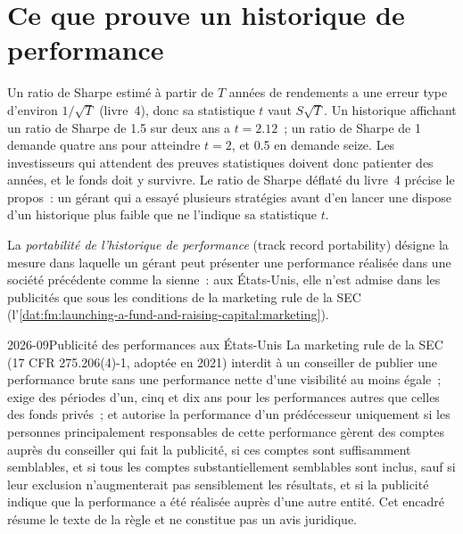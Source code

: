 \section{Ce que prouve un historique de performance}

Un ratio de Sharpe estimé à partir de $T$ années de rendements a une erreur type d'environ $1/\sqrt T$ (livre~4), donc sa statistique $t$ vaut $S\sqrt T$. Un historique
affichant un ratio de Sharpe de 1.5 sur deux ans a $t=2.12$~; un ratio de Sharpe de 1 demande quatre ans pour atteindre $t=2$, et 0.5 en demande seize. Les investisseurs qui
attendent des preuves statistiques doivent donc patienter des années, et le fonds doit y survivre. Le ratio de Sharpe déflaté du livre~4 précise le propos~: un gérant qui
a essayé plusieurs stratégies avant d'en lancer une dispose d'un historique plus faible que ne l'indique sa statistique $t$.

\begin{definition}\label{def:fm:launching-a-fund-and-raising-capital:port}
La \emph{portabilité de l'historique de performance} (track record portability) désigne la mesure dans laquelle un gérant peut présenter une performance réalisée dans une société précédente
comme la sienne~: aux États-Unis, elle n'est admise dans les publicités que sous les conditions de la marketing rule de la SEC
(l'\cref{dat:fm:launching-a-fund-and-raising-capital:marketing}).
\end{definition}

\begin{dated}{2026-09}{Publicité des performances aux États-Unis}\label{dat:fm:launching-a-fund-and-raising-capital:marketing}
La marketing rule de la SEC (17 CFR 275.206(4)-1, adoptée en 2021) interdit à un conseiller de publier une performance brute sans une performance nette d'une visibilité au
moins égale~; exige des périodes d'un, cinq et dix ans pour les performances autres que celles des fonds privés~; et autorise la performance d'un prédécesseur uniquement
si les personnes principalement responsables de cette performance gèrent des comptes auprès du conseiller qui fait la publicité, si ces comptes sont suffisamment semblables, et si tous les comptes substantiellement
semblables sont inclus, sauf si leur exclusion n'augmenterait pas sensiblement les résultats, et si la publicité indique que la performance
a été réalisée auprès d'une autre entité. Cet encadré résume le texte de la règle et ne constitue pas un avis juridique.
\end{dated}

